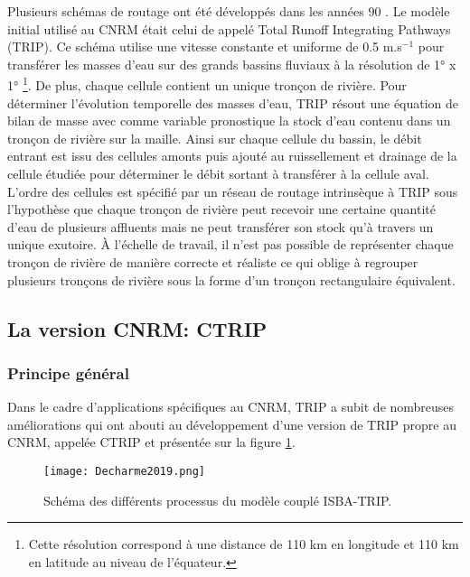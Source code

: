 Plusieurs schémas de routage ont été développés dans les années 90 \citep{vorosmarty1989, coe1998, hagemann1997, fekete2001}. Le modèle initial utilisé au CNRM était celui de \citet{oki1998} appelé Total Runoff Integrating Pathways (TRIP). Ce schéma utilise une vitesse constante et uniforme de 0.5 m.s$^{-1}$ pour transférer les masses d'eau sur des grands bassins fluviaux à la résolution de 1° x 1° \footnote{Cette résolution correspond à une distance de 110 km en longitude et 110 km en latitude au niveau de l'équateur.}. De plus, chaque cellule contient un unique tronçon de rivière. Pour déterminer l'évolution temporelle des masses d'eau, TRIP résout une équation de bilan de masse avec comme variable pronostique la stock d'eau contenu dans un tronçon de rivière sur la maille. Ainsi sur chaque cellule du bassin, le débit entrant est issu des cellules amonts puis ajouté au ruissellement et drainage de la cellule étudiée pour déterminer le débit sortant à transférer à la cellule aval. L'ordre des cellules est spécifié par un réseau de routage intrinsèque à TRIP sous l'hypothèse que chaque tronçon de rivière peut recevoir une certaine quantité d'eau de plusieurs affluents mais ne peut transférer son stock qu'à travers un unique exutoire. À l'échelle de travail, il n'est pas possible de représenter chaque tronçon de rivière de manière correcte et réaliste ce qui oblige à regrouper plusieurs tronçons de rivière sous la forme d'un tronçon rectangulaire équivalent.

\subsection{\selectfont La version CNRM: CTRIP}
\subsubsection{\selectfont Principe général}


\noindent Dans le cadre d'applications spécifiques au CNRM, TRIP a subit de nombreuses améliorations qui ont abouti au développement d'une version de TRIP propre au CNRM, appelée CTRIP et présentée sur la figure \ref{decharme2019}.\\

\begin{figure}[h!]
\centering
  \texttt{[image: Decharme2019.png]}
  \caption{Schéma des différents processus du modèle couplé ISBA-TRIP.}
  \label{decharme2019}
\end{figure} 


